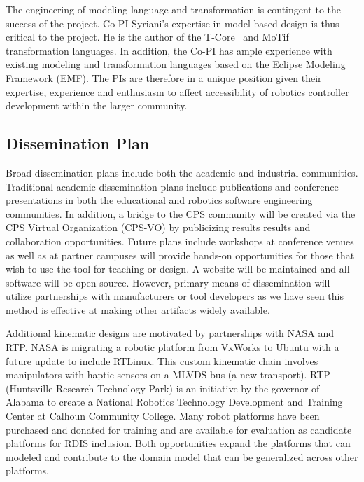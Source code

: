 The engineering of modeling language and transformation is contingent to the success of the project.
Co-PI Syriani's expertise in model-based design is thus critical to the project.
He is the author of the T-Core~\cite{Syriani2010} and MoTif~\cite{Syriani2011} transformation languages.
In addition, the Co-PI has ample experience with existing modeling and transformation languages based on the Eclipse Modeling Framework (EMF).
The PIs are therefore in a unique position given their expertise, experience and enthusiasm to affect accessibility of robotics controller development within the larger community.


\subsection{Dissemination Plan}
Broad dissemination plans include both the academic and industrial communities.  Traditional academic dissemination plans include publications and conference presentations in both the educational and robotics software engineering communities.  In addition, a bridge to the CPS community will be created via the CPS Virtual Organization (CPS-VO) by publicizing results results and collaboration opportunities.  Future plans include workshops at conference venues as well as at partner campuses will provide hands-on opportunities for those that wish to use the tool for teaching or design.  A website will be maintained and all software will be open source.  However, primary means of dissemination will utilize partnerships with manufacturers or tool developers as we have seen this method is effective at making other artifacts widely available.   

Additional kinematic designs are motivated by partnerships with NASA and RTP.  NASA is migrating a robotic platform from VxWorks to Ubuntu with a future update to include RTLinux.  This custom kinematic chain involves manipulators with haptic sensors on a MLVDS bus (a new transport).  RTP (Huntsville Research Technology Park) is an initiative by the governor of Alabama to create a National Robotics Technology Development and Training Center at Calhoun Community College.  Many robot platforms have been purchased and donated for training and are available for evaluation as candidate platforms for RDIS inclusion.  Both opportunities expand the platforms that can modeled and contribute to the domain model that can be generalized across other platforms. 

